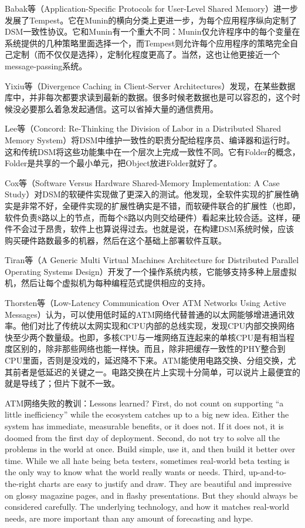 \documentclass[a4paper,twoside]{scrbook}
\begin{document}
Babak等（Application-Specific Protocols for User-Level Shared Memory）进一步发展了Tempest。它在Munin的横向分类上更进一步，为每个应用程序纵向定制了DSM一致性协议。它和Munin有一个重大不同：Munin仅允许程序中的每个变量在系统提供的几种策略里面选择一个，而Tempest则允许每个应用程序的策略完全自己定制（而不仅仅是选择），定制化程度更高了。当然，这也让他更接近一个message-passing系统。

Yixiu等（Divergence Caching in Client-Server Architectures）发现，在某些数据库中，并非每次都要求读到最新的数据。很多时候老数据也是可以容忍的，这个时候没必要那么着急发起通信。这可以省掉大量的通信费用。

Lee等（Concord: Re-Thinking the Division of Labor in a Distributed Shared Memory System）将DSM中维护一致性的职责分配给程序员、编译器和运行时。这和传统DSM将这些功能集中在一个层次上完成一致性不同。它有Folder的概念，Folder是共享的一个最小单元，把Object放进Folder就好了。

Cox等（Software Versus Hardware Shared-Memory Implementation: A Case Study）对DSM的软硬件实现做了更深入的测试。他发现，全软件实现的扩展性确实是非常不好，全硬件实现的扩展性确实是不错，而软硬件联合的扩展性（也即，软件负责8路以上的节点，而每个8路以内则交给硬件）看起来比较合适。这样，硬件不会过于昂贵，软件上也算说得过去。也就是说，在构建DSM系统时候，应该购买硬件路数最多的机器，然后在这个基础上部署软件互联。

Tiran等（A Generic Multi Virtual Machines Architecture for Distributed Parallel Operating Systems Design）开发了一个操作系统内核，它能够支持多种上层虚拟机，然后让每个虚拟机为每种编程范式提供相应的支持。

Thorsten等（Low-Latency Communication Over ATM Networks Using Active Messages）认为，可以使用低时延的ATM网络代替普通的以太网能够增进通讯效率。他们对比了传统以太网实现和CPU内部的总线实现，发现CPU内部交换网络快至少两个数量级。也即，多核CPU与一堆网络互连起来的单核CPU是有相当程度区别的，除非那些网络也能一样快。而且，除非把缓存一致性的PHY整合到CPU里面，否则是没戏的，延迟降不下来。ATM能使用电路交换、分组交换，尤其前者是低延迟的关键之一。电路交换在片上实现十分简单，可以说片上最便宜的就是导线了；但片下就不一致。

ATM网络失败的教训：Lessons learned? First, do not count on supporting “a little inefficiency” while the ecosystem catches up to a big new idea. Either the system has immediate, measurable benefits, or it does not. If it does not, it is doomed from the first day of deployment. Second, do not try to solve all the problems in the world at once. Build simple, use it, and then build it better over time. While we all hate being beta testers, sometimes real-world beta testing is the only way to know what the world really wants or needs. Third, up-and-to-the-right charts are easy to justify and draw. They are beautiful and impressive on glossy magazine pages, and in flashy presentations. But they should always be considered carefully. The underlying technology, and how it matches real-world needs, are more important than any amount of forecasting and hype.
\end{document}
